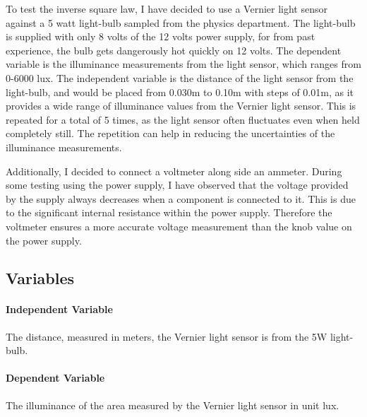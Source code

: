 \documentclass[a4paper,12pt]{article}
\begin{document}
To test the inverse square law, I have decided to use a Vernier light sensor against a 5 watt light-bulb sampled from the physics department. The light-bulb is supplied with only 8 volts of the 12 volts power supply, for from past experience, the bulb gets dangerously hot quickly on 12 volts. The dependent variable is the illuminance measurements from the light sensor, which ranges from 0-6000 lux. The independent variable is the distance of the light sensor from the light-bulb, and would be placed from 0.030m to 0.10m with steps of 0.01m, as it provides a wide range of illuminance values from the Vernier light sensor. This is repeated for a total of 5 times, as the light sensor often fluctuates even when held completely still. The repetition can help in reducing the uncertainties of the illuminance measurements.


Additionally, I decided to connect a voltmeter along side an ammeter. During some testing using the power supply, I have observed that the voltage provided by the supply always decreases when a component is connected to it. This is due to the significant internal resistance within the power supply. Therefore the voltmeter ensures a more accurate voltage measurement than the knob value on the power supply.


\subsection{Variables}
\paragraph{Independent Variable}
The distance, measured in meters, the Vernier light sensor is from the 5W light-bulb.

\paragraph{Dependent Variable}
The illuminance of the area measured by the Vernier light sensor in unit lux.
\end{document}
